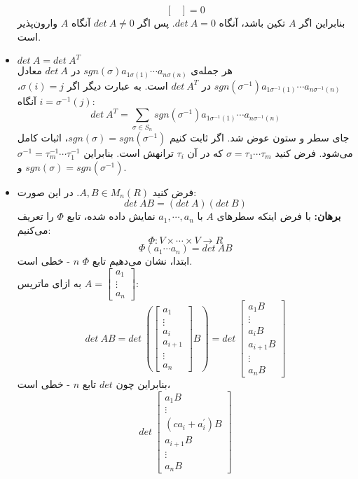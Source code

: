 \begin{itemize}
$$\begin{bmatrix}
	\end{bmatrix}= 0$$
	بنابراین اگر $A$ تکین باشد، آنگاه $det\: A = 0$. پس اگر $det\:A \neq 0$ آنگاه $A$ وارون‌پذیر است.
	\item $det\: A = det\: A^T$\\
	هر جمله‌ی $sgn(\sigma) a_{1\sigma(1)}\cdots a_{n\sigma(n)}$ در $det\: A$ معادل $sgn(\sigma^{-1})a_{1\sigma^{-1}(1)} \cdots a_{n\sigma^{-1}(n)}$ در $det\: A^T$ است. به عبارت دیگر اگر $\sigma(i)=j$، آنگاه $i = \sigma^{-1}(j)$:
	$$det\: A^T = \sum_{\sigma\in S_n} sgn(\sigma^{-1})a_{1\sigma^{-1}(1)} \cdots a_{n\sigma^{-1}(n)} $$
	جای سطر و ستون عوض شد. اگر ثابت کنیم $sgn(\sigma) = sgn(\sigma^{-1})$، اثبات کامل می‌شود. فرض کنید $\sigma = \tau_1 \cdots \tau_m$ که در آن $\tau_i$ ترانهش است. بنابراین $\sigma^{-1}= \tau_m^{-1}\cdots \tau_1^{-1}$ و $sgn(\sigma) = sgn(\sigma^{-1})$.
	\item فرض کنید $A , B \in M_n(R)$. در این صورت:
	$$det\: AB = (det\: A)(det\:B)$$
	\textbf{برهان:} با فرض اینکه سطر‌های $A$ با $a_1,\cdots,a_n$ نمایش داده شده، تابع $\Phi$ را تعریف می‌کنیم:
	$$\Phi: V \times\cdots\times V \rightarrow R$$
	$$\Phi (a_1\cdots a_n) = det\: AB$$
	ابتدا، نشان می‌دهیم تابع $\Phi$ $n$ - خطی است.\\
	به ازای ماتریس $A = \begin{bmatrix}
	a_1 \\ \vdots \\ a_n
	\end{bmatrix}$:
	$$det\: AB = det\: \left( \begin{bmatrix}
	a_1 \\ \vdots \\ a_i \\ a_{i+1}\\ \vdots \\ a_n
	\end{bmatrix}B\right) = det \: \begin{bmatrix}
	a_1B\\ \vdots \\ a_iB\\ a_{i+1}B \\ \vdots \\ a_nB
	\end{bmatrix}$$
	بنابراین چون $det$ تابع $n$ - خطی است،
	$$det\: \begin{bmatrix}
	a_1B \\ \vdots \\ (ca_i+ a_i^\prime)B \\ a_{i+1}B\\ \vdots \\ a_nB

\end{bmatrix}$$
\end{itemize}
